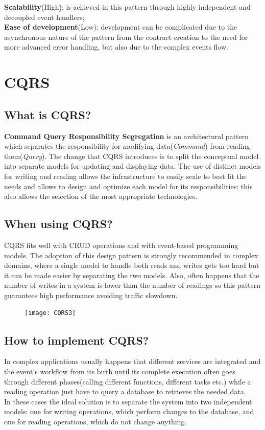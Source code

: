 \documentclass[11pt]{article} %
\begin{document}
 \textbf{Scalability}(\color{darkgreen}High\color{black}): is achieved in this pattern through highly independent and decoupled event handlers; \\
 
 \textbf{Ease of development}(\color{red}Low\color{black}): development can be complicated due to the asynchronous nature of the pattern from the contract creation to the need for more advanced error handling, but also due to the complex events flow.

\newpage
\section{CQRS} 
\subsection{What is CQRS?}
\textbf{Command Query Responsibility Segregation} is an architectural pattern which separates the responsibility for modifying data(\emph{Command}) from reading them(\emph{Query}). The change that CQRS introduces is to split the conceptual model into separate models for updating and displaying data. The use of distinct models for writing and reading allows the infrastructure to easily scale to best fit the needs and allows to design and optimize each model for its responsibilities; this also allows the selection of the most appropriate technologies.

\subsection{When using CQRS?}
CQRS fits well with CRUD operations and with event-based programming models.
The adoption of this design pattern is strongly recommended in complex domains, where a single model to handle both reads and writes gets too hard but it can be made easier by separating the two models. Also, often happens that the number of writes in a system is lower than the number of readings so this pattern guarantees high performance avoiding traffic slowdown.\\

\begin{figure} [H]
	\centering
	\texttt{[image: CQRS3]}
\end{figure} 


\subsection{How to implement CQRS?}
In complex applications usually happens that different services are integrated and the event's workflow from its birth until its complete execution often goes through different phases(calling different functions, different tasks etc.) while a reading operation just have to query a database to retrieves the needed data. \\
In these cases the ideal solution is to separate the system into two independent models: one for writing operations, which perform changes to the database, and one for reading operations, which do not change anything.
  
\end{document}

